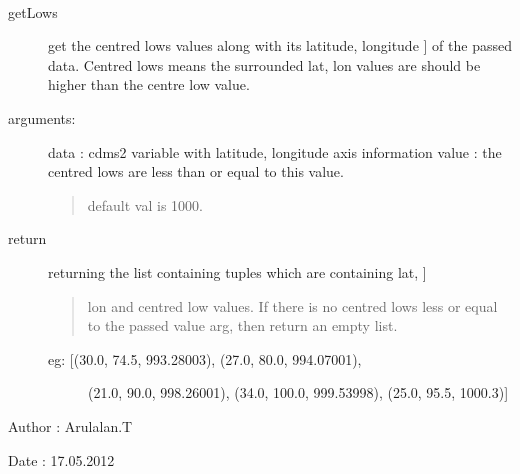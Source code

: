\documentclass[letterpaper,10pt,english]{sphinxmanual}
\begin{document}
\begin{fulllineitems}
\label{others:weatherutils.getLows}~\begin{description}
\item[{getLows}] \leavevmode{[}get the centred lows values along with its latitude, longitude  {]}
of the passed data. Centred lows means the surrounded lat, lon 
values are should be higher than the centre low value.

\item[{arguments:}] \leavevmode
data : cdms2 variable with latitude, longitude axis information
value : the centred lows are less than or equal to this value.
\begin{quote}

default val is 1000.
\end{quote}

\item[{return}] \leavevmode{[}returning the list containing tuples which are containing lat, {]}\begin{quote}

lon and centred low values. If there is no centred lows less or
equal to the passed value arg, then return an empty list.
\end{quote}
\begin{description}
\item[{eg: {[}(30.0, 74.5, 993.28003), (27.0, 80.0, 994.07001), }] \leavevmode
(21.0, 90.0, 998.26001), (34.0, 100.0, 999.53998), 
(25.0, 95.5, 1000.3){]}

\end{description}

\end{description}

Author : Arulalan.T

Date : 17.05.2012

\end{fulllineitems}

\end{document}
